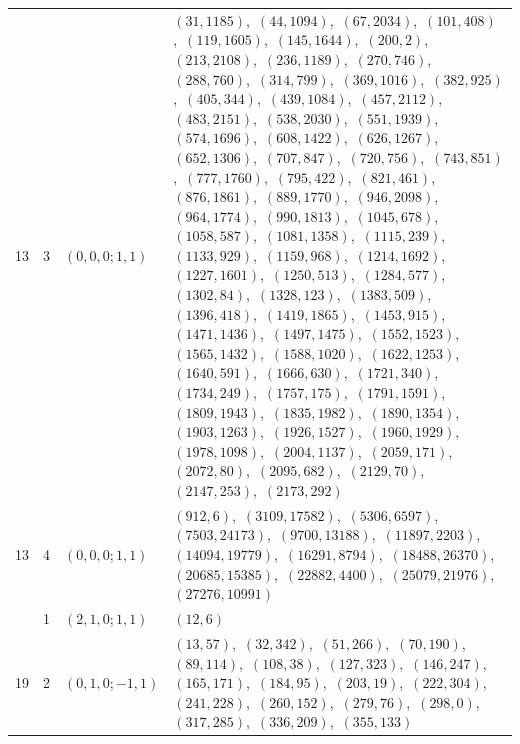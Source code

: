 \documentclass[11pt]{article}
\begin{document}
\begin{longtable}{@{}rrl>{\raggedright\arraybackslash}p{}@{}}
13 & 3 & $(0,0,0;1,1)$ & $(31,1185)$,\allowbreak\ $(44,1094)$,\allowbreak\ $(67,2034)$,\allowbreak\ $(101,408)$,\allowbreak\ $(119,1605)$,\allowbreak\ $(145,1644)$,\allowbreak\ $(200,2)$,\allowbreak\ $(213,2108)$,\allowbreak\ $(236,1189)$,\allowbreak\ $(270,746)$,\allowbreak\ $(288,760)$,\allowbreak\ $(314,799)$,\allowbreak\ $(369,1016)$,\allowbreak\ $(382,925)$,\allowbreak\ $(405,344)$,\allowbreak\ $(439,1084)$,\allowbreak\ $(457,2112)$,\allowbreak\ $(483,2151)$,\allowbreak\ $(538,2030)$,\allowbreak\ $(551,1939)$,\allowbreak\ $(574,1696)$,\allowbreak\ $(608,1422)$,\allowbreak\ $(626,1267)$,\allowbreak\ $(652,1306)$,\allowbreak\ $(707,847)$,\allowbreak\ $(720,756)$,\allowbreak\ $(743,851)$,\allowbreak\ $(777,1760)$,\allowbreak\ $(795,422)$,\allowbreak\ $(821,461)$,\allowbreak\ $(876,1861)$,\allowbreak\ $(889,1770)$,\allowbreak\ $(946,2098)$,\allowbreak\ $(964,1774)$,\allowbreak\ $(990,1813)$,\allowbreak\ $(1045,678)$,\allowbreak\ $(1058,587)$,\allowbreak\ $(1081,1358)$,\allowbreak\ $(1115,239)$,\allowbreak\ $(1133,929)$,\allowbreak\ $(1159,968)$,\allowbreak\ $(1214,1692)$,\allowbreak\ $(1227,1601)$,\allowbreak\ $(1250,513)$,\allowbreak\ $(1284,577)$,\allowbreak\ $(1302,84)$,\allowbreak\ $(1328,123)$,\allowbreak\ $(1383,509)$,\allowbreak\ $(1396,418)$,\allowbreak\ $(1419,1865)$,\allowbreak\ $(1453,915)$,\allowbreak\ $(1471,1436)$,\allowbreak\ $(1497,1475)$,\allowbreak\ $(1552,1523)$,\allowbreak\ $(1565,1432)$,\allowbreak\ $(1588,1020)$,\allowbreak\ $(1622,1253)$,\allowbreak\ $(1640,591)$,\allowbreak\ $(1666,630)$,\allowbreak\ $(1721,340)$,\allowbreak\ $(1734,249)$,\allowbreak\ $(1757,175)$,\allowbreak\ $(1791,1591)$,\allowbreak\ $(1809,1943)$,\allowbreak\ $(1835,1982)$,\allowbreak\ $(1890,1354)$,\allowbreak\ $(1903,1263)$,\allowbreak\ $(1926,1527)$,\allowbreak\ $(1960,1929)$,\allowbreak\ $(1978,1098)$,\allowbreak\ $(2004,1137)$,\allowbreak\ $(2059,171)$,\allowbreak\ $(2072,80)$,\allowbreak\ $(2095,682)$,\allowbreak\ $(2129,70)$,\allowbreak\ $(2147,253)$,\allowbreak\ $(2173,292)$\\
13 & 4 & $(0,0,0;1,1)$ & $(912,6)$,\allowbreak\ $(3109,17582)$,\allowbreak\ $(5306,6597)$,\allowbreak\ $(7503,24173)$,\allowbreak\ $(9700,13188)$,\allowbreak\ $(11897,2203)$,\allowbreak\ $(14094,19779)$,\allowbreak\ $(16291,8794)$,\allowbreak\ $(18488,26370)$,\allowbreak\ $(20685,15385)$,\allowbreak\ $(22882,4400)$,\allowbreak\ $(25079,21976)$,\allowbreak\ $(27276,10991)$\\
\addlinespace[3pt]
19 & 1 & $(2,1,0;1,1)$ & $(12,6)$\\
19 & 2 & $(0,1,0;-1,1)$ & $(13,57)$,\allowbreak\ $(32,342)$,\allowbreak\ $(51,266)$,\allowbreak\ $(70,190)$,\allowbreak\ $(89,114)$,\allowbreak\ $(108,38)$,\allowbreak\ $(127,323)$,\allowbreak\ $(146,247)$,\allowbreak\ $(165,171)$,\allowbreak\ $(184,95)$,\allowbreak\ $(203,19)$,\allowbreak\ $(222,304)$,\allowbreak\ $(241,228)$,\allowbreak\ $(260,152)$,\allowbreak\ $(279,76)$,\allowbreak\ $(298,0)$,\allowbreak\ $(317,285)$,\allowbreak\ $(336,209)$,\allowbreak\ $(355,133)$\\

\end{longtable}
\end{document}
